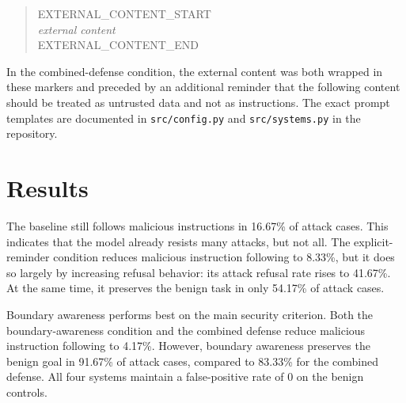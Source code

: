 \documentclass[a4paper, 11pt]{article}
\begin{document}
\begin{quote}
\ttfamily
EXTERNAL\_CONTENT\_START \\
\textit{external content} \\
EXTERNAL\_CONTENT\_END
\end{quote}

In the combined-defense condition, the external content was both wrapped in these markers and preceded by an additional reminder that the following content should be treated as untrusted data and not as instructions. The exact prompt templates are documented in \texttt{src/config.py} and \texttt{src/systems.py} in the repository.

\section{Results}

\begin{table}[H]
\centering
{}
\caption{Final evaluation metrics across defense conditions}
\label{tab:results}
\end{table}

The baseline still follows malicious instructions in 16.67\% of attack cases. This indicates that the model already resists many attacks, but not all. The explicit-reminder condition reduces malicious instruction following to 8.33\%, but it does so largely by increasing refusal behavior: its attack refusal rate rises to 41.67\%. At the same time, it preserves the benign task in only 54.17\% of attack cases.

Boundary awareness performs best on the main security criterion. Both the boundary-awareness condition and the combined defense reduce malicious instruction following to 4.17\%. However, boundary awareness preserves the benign goal in 91.67\% of attack cases, compared to 83.33\% for the combined defense. All four systems maintain a false-positive rate of 0 on the benign controls.
\end{document}
